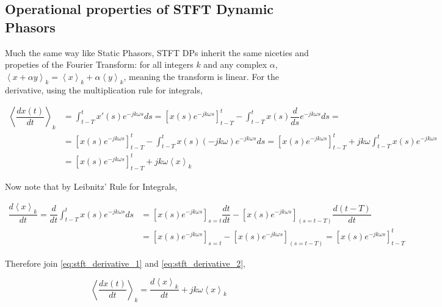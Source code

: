 \subsection{Operational properties of STFT Dynamic Phasors} %

	Much the same way like Static Phasors, STFT DPs inherit the same niceties and propeties of the Fourier Transform: for all integers $k$ and any complex $\alpha$, $\left\langle x + \alpha y\right\rangle_k = \left\langle x\right\rangle_k + \alpha\left\langle y\right\rangle_k$, meaning the transform is linear. For the derivative, using the multiplication rule for integrals,

\begin{align}
	\left\langle \dfrac{dx(t)}{dt}\right\rangle_k &= \int^{t}_{t-T} x'(s)e^{-jk\omega s} ds = \left[x(s) e^{-jk\omega s}\right]_{t-T}^t - \int^{t}_{t-T} x(s) \dfrac{d}{ds} e^{-jk\omega s} ds = \nonumber\\[3mm]
	&= \left[x(s) e^{-jk\omega s}\right]_{t-T}^t - \int^{t}_{t-T} x(s) \left(-jk\omega\right) e^{-jk\omega s} ds = \left[x(s) e^{-jk\omega s}\right]_{t-T}^t + jk\omega \int^{t}_{t-T} x(s) e^{-jk\omega s} \nonumber\\[3mm]
	&= \left[x(s) e^{-jk\omega s}\right]_{t-T}^t + jk\omega \left< x\right>_k \label{eq:stft_derivative_1}
\end{align}

	Now note that by Leibnitz' Rule for Integrals,

\begin{align}
	\dfrac{d \left\langle x\right\rangle_k}{dt} = \dfrac{d}{dt} \int^{t}_{t-T} x(s)e^{-jk\omega s} ds &= \left[x(s)e^{-jk\omega s}\right]_{s=t}\dfrac{dt}{dt} - \left[x(s)e^{-jk\omega s}\right]_{\left(s=t-T\right)}\dfrac{d\left(t-T\right)}{dt} \nonumber\\[3mm]
	&= \left[x(s)e^{-jk\omega s}\right]_{s=t} - \left[x(s)e^{-jk\omega s}\right]_{\left(s=t-T\right)} = \left[x(s)e^{-jk\omega s}\right]^t_{t-T} \label{eq:stft_derivative_2}
\end{align}

	Therefore join \eqref{eq:stft_derivative_1} and \eqref{eq:stft_derivative_2},

\begin{equation} \left\langle \dfrac{dx(t)}{dt}\right\rangle_k = \dfrac{d\left\langle x\right\rangle_k}{dt} + jk\omega \left\langle x\right\rangle_k \label{eq:stft_derivative_3} \end{equation}


